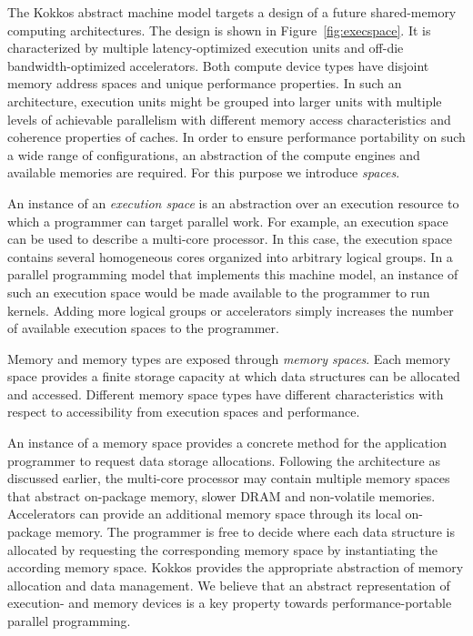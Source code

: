The Kokkos abstract machine model targets a design of a future shared-memory computing architectures. The design is shown in Figure~\ref{fig:execspace}. It is characterized by multiple latency-optimized execution units and off-die bandwidth-optimized accelerators. Both compute device types have disjoint memory address spaces and unique performance properties. In such an architecture,   execution units might be grouped into larger units with multiple levels of achievable parallelism with different memory access characteristics and coherence properties of caches. In order to ensure performance portability on such a wide range of configurations, an abstraction of the compute engines and available memories are required. For this purpose we introduce \emph{spaces}.

An instance of an \emph{execution space} is an abstraction over an execution resource to which a programmer can target parallel work. For example, an execution space can be used to describe a multi-core processor. In this case, the execution space contains several homogeneous cores organized into arbitrary logical groups. In a parallel programming model that implements this machine model, an instance of such an execution space would be made available to the programmer to run kernels. Adding more logical groups or accelerators simply increases the number of available execution spaces to the programmer.

Memory and memory types are exposed through \emph{memory spaces}. Each memory space provides a finite storage capacity at which data structures can be allocated and accessed. Different memory space types have different characteristics with respect to accessibility from execution spaces and performance. 

An instance of a memory space provides a concrete method for the application programmer to request data storage allocations. Following the architecture as discussed earlier, the multi-core processor may contain multiple memory spaces that abstract on-package memory, slower DRAM and non-volatile memories. Accelerators can provide an additional memory space through its local on-package memory. The programmer is free to decide where each data structure is allocated by requesting the corresponding memory space by instantiating the according memory space. Kokkos provides the appropriate abstraction of memory allocation and data management. We believe that an abstract representation of execution- and memory devices is a key property towards performance-portable parallel programming.


